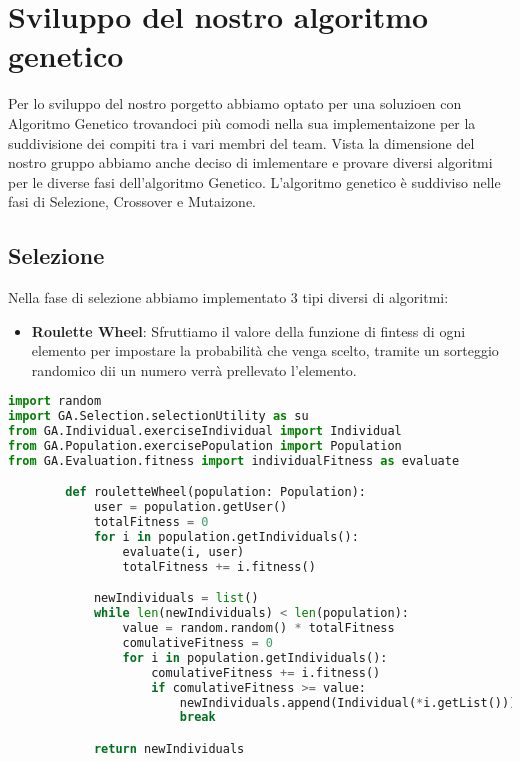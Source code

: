 \documentclass{article}
\begin{document}
\pagebreak


    \section{Sviluppo del nostro algoritmo genetico}
    Per lo sviluppo del nostro porgetto abbiamo optato per una soluzioen con Algoritmo Genetico trovandoci più comodi nella sua implementaizone per la suddivisione dei compiti tra i vari membri del team.
    Vista la dimensione del nostro gruppo abbiamo anche deciso di imlementare e provare diversi algoritmi per le diverse fasi dell'algoritmo Genetico.
    L'algoritmo genetico è suddiviso nelle fasi di Selezione, Crossover e Mutaizone.
    \subsection{Selezione}
    Nella fase di selezione abbiamo implementato 3 tipi diversi di algoritmi:
    \begin{itemize}
        \item\textbf{Roulette Wheel}: Sfruttiamo il valore della funzione di fintess di ogni elemento per impostare la probabilità che venga scelto, tramite un sorteggio randomico dii un numero verrà prellevato l'elemento.
    \end{itemize}
        \begin{lstlisting}[language=Python, breaklines, no caption]
import random
import GA.Selection.selectionUtility as su
from GA.Individual.exerciseIndividual import Individual
from GA.Population.exercisePopulation import Population
from GA.Evaluation.fitness import individualFitness as evaluate

        def rouletteWheel(population: Population):
            user = population.getUser()
            totalFitness = 0
            for i in population.getIndividuals():
                evaluate(i, user)
                totalFitness += i.fitness()

            newIndividuals = list()
            while len(newIndividuals) < len(population):
                value = random.random() * totalFitness
                comulativeFitness = 0
                for i in population.getIndividuals():
                    comulativeFitness += i.fitness()
                    if comulativeFitness >= value:
                        newIndividuals.append(Individual(*i.getList()))
                        break

            return newIndividuals
        \end{lstlisting}
\end{document}
